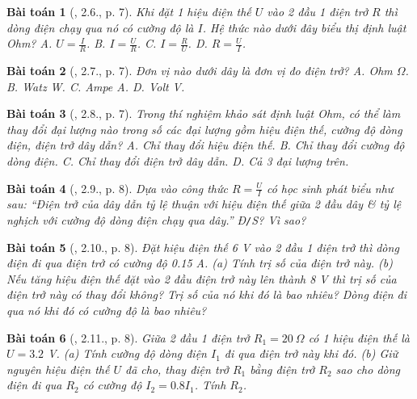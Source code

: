 \documentclass{article}
\newtheorem{baitoan}{Bài toán}
\begin{document}
\begin{baitoan}[\cite{SBT_Vat_Ly_9}, 2.6., p. 7]
	Khi đặt 1 hiệu điện thế $U$ vào 2 đầu 1 điện trở $R$ thì dòng điện chạy qua nó có cường độ là $I$. Hệ thức nào dưới đây biểu thị định luật Ohm? {\sf A.} $U = \frac{I}{R}$. {\sf B.} $I = \frac{U}{R}$. {\sf C.} $I = \frac{R}{U}$. {\sf D.} $R = \frac{U}{I}$.
\end{baitoan}

\begin{baitoan}[\cite{SBT_Vat_Ly_9}, 2.7., p. 7]
	 Đơn vị nào dưới dây là đơn vị đo điện trở? {\sf A.} Ohm $\Omega$. {\sf B.} Watz W. {\sf C.} Ampe A. {\sf D.} Volt V.
\end{baitoan}

\begin{baitoan}[\cite{SBT_Vat_Ly_9}, 2.8., p. 7]
	Trong thí nghiệm khảo sát định luật Ohm, có thể làm thay đổi đại lượng nào trong số các đại lượng gồm hiệu điện thế, cường độ dòng điện, điện trở dây dẫn? {\sf A.} Chỉ thay đổi hiệu điện thế. {\sf B.} Chỉ thay đổi cường độ dòng điện. {\sf C.} Chỉ thay đổi điện trở dây dẫn. {\sf D.} Cả 3 đại lượng trên.
\end{baitoan}

\begin{baitoan}[\cite{SBT_Vat_Ly_9}, 2.9., p. 8]
	Dựa vào công thức $R = \frac{U}{I}$ có học sinh phát biểu như sau: ``Điện trở của dây dẫn tỷ lệ thuận với hiệu điện thế giữa 2 đầu dây \& tỷ lệ nghịch với cường độ dòng điện chạy qua dây.'' \emph{Đ\texttt{/}S?} Vì sao?
\end{baitoan}

\begin{baitoan}[\cite{SBT_Vat_Ly_9}, 2.10., p. 8]
	Đặt hiệu điện thế \emph{6 V} vào 2 đầu 1 điện trở thì dòng điện đi qua điện trở có cường độ \emph{0.15 A}. (a) Tính trị số của điện trở này. (b) Nếu tăng hiệu điện thế đặt vào 2 đầu điện trở này lên thành \emph{8 V} thì trị số của điện trở này có thay đổi không? Trị số của nó khi đó là bao nhiêu? Dòng điện đi qua nó khi đó có cường độ là bao nhiêu?
\end{baitoan}

\begin{baitoan}[\cite{SBT_Vat_Ly_9}, 2.11., p. 8]
	Giữa 2 đầu 1 điện trở $R_1 = 20\ \Omega$ có 1 hiệu điện thế là $U = 3.2$ \emph{V}. (a) Tính cường độ dòng điện $I_1$ đi qua điện trở này khi đó. (b) Giữ nguyên hiệu điện thế $U$ đã cho, thay điện trở $R_1$ bằng điện trở $R_2$ sao cho dòng điện đi qua $R_2$ có cường độ $I_2 = 0.8I_1$. Tính $R_2$.
\end{baitoan}
\end{document}
